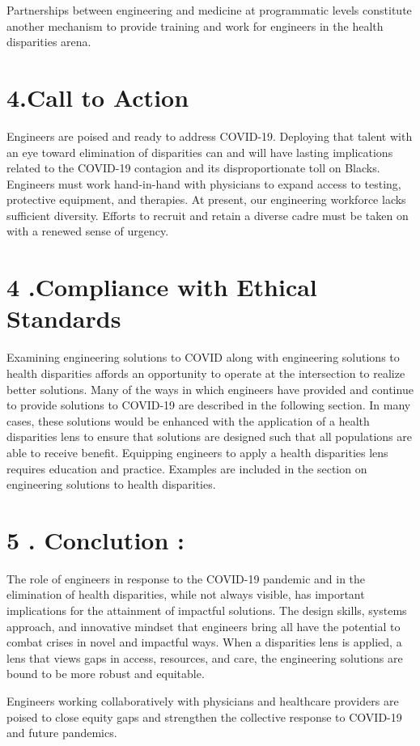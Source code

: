 \documentclass[12pt]{article}
\begin{document}
Partnerships between engineering and medicine at programmatic levels constitute another mechanism to provide training and work for engineers in the health disparities arena. 

\section*{4.Call to Action }
Engineers are poised and ready to address COVID-19. Deploying that talent with an eye toward elimination of disparities can and will have lasting implications related to the COVID-19 contagion and its disproportionate toll on Blacks. Engineers must work hand-in-hand with physicians to expand access to testing, protective equipment, and therapies. At present, our engineering workforce lacks sufficient diversity. Efforts to recruit and retain a diverse cadre must be taken on with a renewed sense of urgency.

\section*{ 4 .Compliance with Ethical Standards }
Examining engineering solutions to COVID along with engineering solutions to health disparities affords an opportunity to operate at the intersection to realize better solutions. Many of the ways in which engineers have provided and continue to provide solutions to COVID-19 are described in the following section. In many cases, these solutions would be enhanced with the application of a health disparities lens to ensure that solutions are designed such that all populations are able to receive benefit. Equipping engineers to apply a health disparities lens requires education and practice. Examples are included in the section on engineering solutions to health disparities. 

\section*{5 . Conclution :}
The role of engineers in response to the COVID-19 pandemic and in the elimination of health disparities, while not always visible, has important implications for the attainment of impactful solutions. The design skills, systems approach, and innovative mindset that engineers bring all have the potential to combat crises in novel and impactful ways. When a disparities lens is applied, a lens that views gaps in access, resources, and care, the engineering solutions are bound to be more robust and equitable.

Engineers working collaboratively with physicians and healthcare providers are poised to close equity gaps and strengthen the collective response to COVID-19 and future pandemics.
\end{document}

